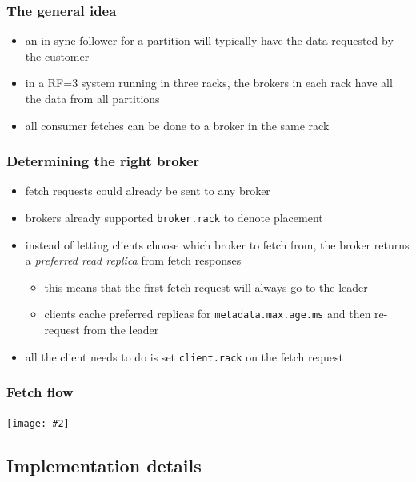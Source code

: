 \documentclass{beamer}
\newcommand{\diagram}[2][1]{
  \begin{center}
    \texttt{[image: \#2]}
  \end{center}
}
\newlength{\wideitemsep}
\let\olditem\item
\renewcommand{\item}{\setlength{\itemsep}{\wideitemsep}\olditem}
\begin{document}
\begin{frame}
  \frametitle{The general idea}

  \begin{itemize}
  \item an in-sync follower for a partition will \alert{typically} have the data requested by the customer
  \item in a RF=3 system running in three racks, the brokers in each rack have \alert{all the data} from \alert{all partitions}
  \item \alert{all} consumer fetches can be done to a broker in the \alert{same rack}
  \end{itemize}
\end{frame}

\begin{frame}
  \frametitle{Determining the right broker}

  \begin{itemize}
  \item fetch requests could \alert{already} be sent to any broker
  \item brokers \alert{already} supported \texttt{broker.rack} to denote placement
  \item instead of letting clients choose which broker to fetch from, the \alert{broker returns a \textit{preferred read replica}} from fetch responses
    \begin{itemize}
    \item this means that the \alert{first} fetch request will always go to the \alert{leader}
    \item clients \alert{cache} preferred replicas for \texttt{metadata.max.age.ms} and then \alert{re-request} from the leader
    \end{itemize}
  \item all the client needs to do is set \alert{\texttt{client.rack}} on the fetch request
  \end{itemize}
\end{frame}

\begin{frame}
  \frametitle{Fetch flow}

  \diagram{fetch-flow}
\end{frame}

\subsection{Implementation details}
\end{document}
